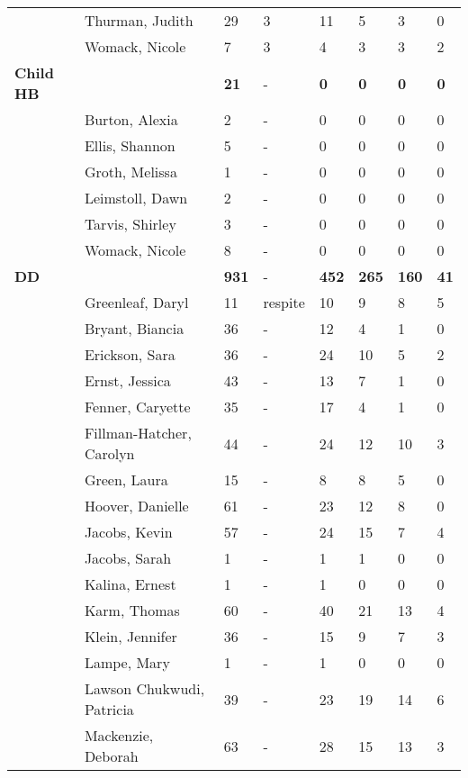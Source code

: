 \documentclass{article}\usepackage[]{graphicx}\usepackage[]{color}
\begin{document}
{\begin{longtable} { >{\raggedright}p{}p{}p{}p{}p{}p{}p{}p{}}
   & Thurman, Judith & 29 & 3 & 11 & 5 & 3 & 0 \\ 
   & Womack, Nicole & 7 & 3 & 4 & 3 & 3 & 2 \\ 
   \hline
\textbf{Child HB} &  & \textbf{21} & - & \textbf{0} & \textbf{0} & \textbf{0} & \textbf{0} \\ 
   \rowcolor[gray]{0.90} & Burton, Alexia & 2 & - & 0 & 0 & 0 & 0 \\ 
   \rowcolor[gray]{0.90} & Ellis, Shannon & 5 & - & 0 & 0 & 0 & 0 \\ 
   & Groth, Melissa & 1 & - & 0 & 0 & 0 & 0 \\ 
   & Leimstoll, Dawn & 2 & - & 0 & 0 & 0 & 0 \\ 
   & Tarvis, Shirley & 3 & - & 0 & 0 & 0 & 0 \\ 
   \rowcolor[gray]{0.90} & Womack, Nicole & 8 & - & 0 & 0 & 0 & 0 \\ 
   \hline
\textbf{DD} &  & \textbf{931} & - & \textbf{452} & \textbf{265} & \textbf{160} & \textbf{41} \\ 
   \rowcolor[gray]{0.90} & Greenleaf, Daryl & 11 & respite & 10 & 9 & 8 & 5 \\ 
   & Bryant, Biancia & 36 & - & 12 & 4 & 1 & 0 \\ 
   & Erickson, Sara & 36 & - & 24 & 10 & 5 & 2 \\ 
   & Ernst, Jessica & 43 & - & 13 & 7 & 1 & 0 \\ 
   \rowcolor[gray]{0.90} & Fenner, Caryette & 35 & - & 17 & 4 & 1 & 0 \\ 
   \rowcolor[gray]{0.90} & Fillman-Hatcher, Carolyn & 44 & - & 24 & 12 & 10 & 3 \\ 
   \rowcolor[gray]{0.90} & Green, Laura & 15 & - & 8 & 8 & 5 & 0 \\ 
   & Hoover, Danielle & 61 & - & 23 & 12 & 8 & 0 \\ 
   & Jacobs, Kevin & 57 & - & 24 & 15 & 7 & 4 \\ 
   & Jacobs, Sarah & 1 & - & 1 & 1 & 0 & 0 \\ 
   \rowcolor[gray]{0.90} & Kalina, Ernest & 1 & - & 1 & 0 & 0 & 0 \\ 
   \rowcolor[gray]{0.90} & Karm, Thomas & 60 & - & 40 & 21 & 13 & 4 \\ 
   \rowcolor[gray]{0.90} & Klein, Jennifer & 36 & - & 15 & 9 & 7 & 3 \\ 
   & Lampe, Mary & 1 & - & 1 & 0 & 0 & 0 \\ 
   & Lawson Chukwudi, Patricia & 39 & - & 23 & 19 & 14 & 6 \\ 
   & Mackenzie, Deborah & 63 & - & 28 & 15 & 13 & 3 \\ 

\end{longtable}}
\end{document}
